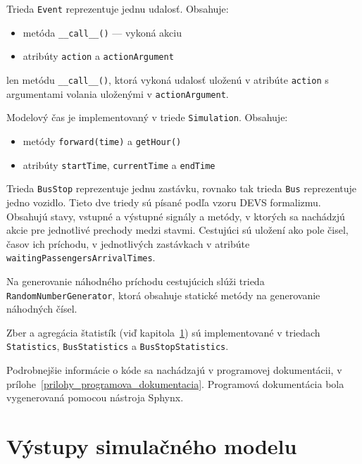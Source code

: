 Trieda \texttt{Event} reprezentuje jednu udalosť.
Obsahuje:
\begin{itemize}
  \item metóda \texttt{\_\_call\_\_()} --- vykoná akciu
  \item atribúty \texttt{action} a \texttt{actionArgument}
\end{itemize}

len metódu \texttt{\_\_call\_\_()}, ktorá vykoná udalosť uloženú v atribúte \texttt{action} s argumentami volania uloženými v \texttt{actionArgument}.

Modelový čas je implementovaný v triede \texttt{Simulation}.
Obsahuje:
\begin{itemize}
  \item metódy \texttt{forward(time)} a \texttt{getHour()}
  \item atribúty \texttt{startTime}, \texttt{currentTime} a \texttt{endTime}
\end{itemize}

Trieda \texttt{BusStop} reprezentuje jednu zastávku, rovnako tak trieda \texttt{Bus} reprezentuje jedno vozidlo.
Tieto dve triedy sú písané podľa vzoru DEVS formalizmu. Obsahujú stavy, vstupné a výstupné signály a metódy, v ktorých sa nachádzjú akcie pre jednotlivé prechody medzi stavmi.
Cestujúci sú uložení ako pole čisel, časov ich príchodu, v jednotlivých zastávkach v atribúte \texttt{waitingPassengersArrivalTimes}.

Na generovanie náhodného príchodu cestujúcich slúži trieda \texttt{RandomNumberGenerator}, ktorá obsahuje statické metódy na generovanie náhodných čísel.

Zber a agregácia štatistík (viď kapitola~\ref{vystupy_simulacneho_modelu}) sú implementované v triedach \texttt{Statistics}, \texttt{BusStatistics} a \texttt{BusStopStatistics}.

Podrobnejšie informácie o kóde sa nachádzajú v programovej dokumentácii, v prílohe~\ref{prilohy_programova_dokumentacia}.
Programová dokumentácia bola vygenerovaná pomocou nástroja Sphynx.

\section{Výstupy simulačného modelu}
\label{vystupy_simulacneho_modelu}

